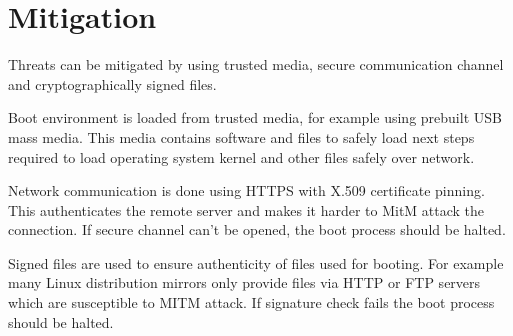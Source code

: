 \section{Mitigation}

Threats can be mitigated by using trusted media, secure communication
channel and cryptographically signed files.

Boot environment is loaded from trusted media, for example using
prebuilt USB mass media. This media contains software and files to
safely load next steps required to load operating system kernel and
other files safely over network.

Network communication is done using HTTPS with X.509 certificate
pinning. This authenticates the remote server and makes it harder to
MitM attack the connection. If secure channel can't be opened, the
boot process should be halted.

Signed files are used to ensure authenticity of files used for
booting. For example many Linux distribution mirrors only provide
files via HTTP or FTP servers which are susceptible to MITM attack. If
signature check fails the boot process should be halted.
